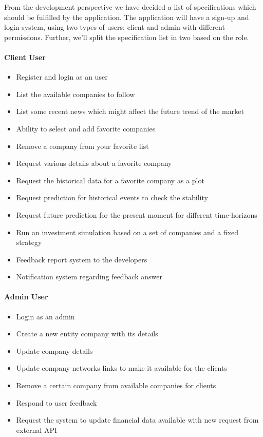 \vspace{5mm}

From the development perspective we have decided a list of specifications which should be fulfilled by the application. The application will have a sign-up and login system, using two types of users: client and admin with different permissions. Further, we'll split the specification list in two based on the role.

\paragraph{Client User}
\begin{itemize}
    \item Register and login as an user
    \item List the available companies to follow
    \item List some recent news which might affect the future trend of the market
    \item Ability to select and add favorite companies
    \item Remove a company from your favorite list
    \item Request various details about a favorite company
    \item Request the historical data for a favorite company as a plot
    \item Request prediction for historical events to check the stability
    \item Request future prediction for the present moment for different time-horizons
    \item Run an investment simulation based on a set of companies and a fixed strategy
    \item Feedback report system to the developers
    \item Notification system regarding feedback answer
\end{itemize}

\paragraph{Admin User}
\begin{itemize}
    \item Login as an admin
    \item Create a new entity company with its details
    \item Update company details
    \item Update company networks links to make it available for the clients
    \item Remove a certain company from available companies for clients
    \item Respond to user feedback
    \item Request the system to update financial data available with new request from external API
\end{itemize}


